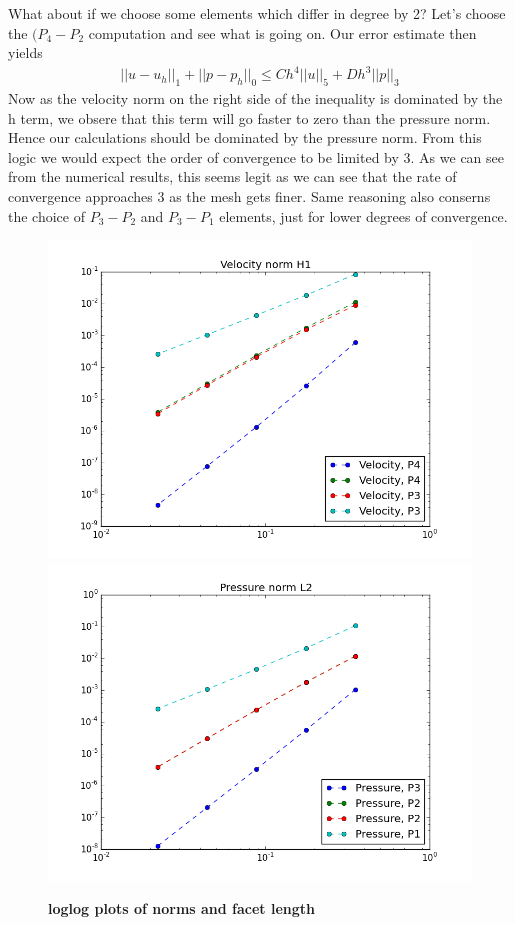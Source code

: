 \documentclass[a4paper,norsk]{article}
\begin{document}
What  about if we choose some elements which differ in degree by 2? Let's choose the $(P_4 - P_2$ computation and see what is going on. Our error estimate then yields
\begin{align*}
 ||u - u_h||_1 + ||p - p_h||_0 \leq Ch^4||u||_{5} + Dh^{3} ||p||_{3}
\end{align*}
Now as the velocity norm on the right side of the inequality is dominated by the h term, we obsere that this term will go faster to zero than the pressure norm. Hence our
calculations should be dominated by the pressure norm. From this logic we would expect the order of convergence to be limited by 3. As we can see from the numerical results, this seems legit as we can see that the rate of convergence
approaches 3 as the mesh gets finer.  Same reasoning also conserns the choice of
$P_3-P_2$ and $P_3 - P_1$ elements, just for lower degrees of convergence.


\begin{figure}[h!]
	\centering
	\caption*{\textbf{loglog plots of norms and facet length}}
	\includegraphics[scale=0.36]{velocity.png}
		\includegraphics[scale=0.36]{pressure.png}
\end{figure}
\end{document}
